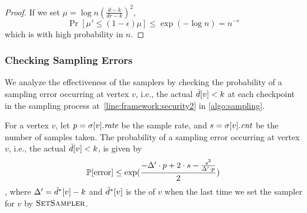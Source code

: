 {\begin{proof}
    If we set $\mu=\log n(\frac{d-k}{dr-k})^2$, 
    $$\Pr[\mu'\leq (1-\epsilon)\mu]\leq \exp(-\log n) = n^{-c}$$
    which is with high probability in $n$.
\end{proof}

\subsubsection{Checking Sampling Errors} 
\label{sec:check_error}
We analyze the effectiveness of the samplers by checking the 
probability of a sampling error occurring at vertex $v$, i.e., the actual \induceddegree{} $\tilde{d}[v] < k$
at each checkpoint in the sampling process at~\cref{line:framework:security2} in \cref{algo:sampling}.
\begin{theorem}
    \label{thm:sampling}
    For a vertex $v$, let $p=\sigma[v].\text{\it rate}$ be the sample rate, and $s=\sigma[v].\text{\it cnt}$ be the number of samples taken. 
    The probability of a sampling error occurring at vertex $v$, i.e., the actual \induceddegree{} $\tilde{d}[v] < k$, is given by
     \begin{equation}\label{eqn:error_value}
        \mathbb{P}[\text{error}] \leq \exp(\frac{-\Delta' \cdot p + 2 \cdot s - \frac{{s}^2}{\Delta' \cdot p}}{2})
      \end{equation}
     , where $\Delta' = \tilde{d}^*[v] - k$ and $\tilde{d}^*[v]$ is the \induceddegree{} of $v$ when the last time we set the sampler for $v$ by ${\mbox{\sc{SetSampler}}}$.
\end{theorem}
    

}
